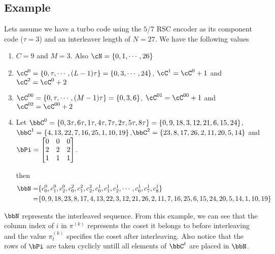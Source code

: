 \subsection{Example}
Lets assume we have a turbo code using the $5/7$ RSC encoder as its component code ($\tau=3$) and an interleaver length of $N=27$. We have the following values
\begin{enumerate}
\item $C=9$ and $M=3$. Also $\cN=\{0,1,\cdots,26\}$

\item $\cC^0=\{0,\tau,\cdots,(L-1)\tau\} = \{0,3,\cdots,24\}$, $\cC^1=\cC^0+1$ and $\cC^2=\cC^0+2$

\item $\cC^{00}=\{0,\tau,\cdots,(M-1)\tau\} = \{0,3,6\}$, $\cC^{01}=\cC^{00}+1$ and $\cC^{02}=\cC^{00}+2$

\item Let $\bbC^0=\{0, 3\tau, 6\tau, 1\tau, 4\tau, 7\tau, 2\tau, 5\tau, 8\tau \} = \{0, 9, 18, 3,12, 21, 6, 15, 24 \} $, $\bbC^1=\{4, 13, 22, 7, 16, 25, 1, 10, 19 \}$,$\bbC^2=\{ 23, 8, 17, 26, 2, 11, 20, 5, 14\} $ and $\bPi=\begin{bmatrix}0 & 0 & 0\cr2 & 2 & 2\cr1 & 1 & 1\end{bmatrix}$.

then 
 \begin{equation}
\begin{split}
\bbN=&\{c^0_0,c^0_1,c_2^0 ,c^2_0,c^2_1,c_2^2 ,c^1_0,c^1_1,c^1_2,\cdots, c^1_6,c^1_7,c^1_8\}\\
 =& \{0,9,18, 23,8,17,4,13,22 ,3,12,21,26,2,11,7,16,25,6,15,24,20,5,14,1,10,19\}
 \end{split}
 \end{equation}

\end{enumerate}
$\bbN$ represents the interleaved sequence. From this example, we can see that the column index of $i$ in $\pi^{(k)}$ represents the coset it belongs to before interleaving and the value $\pi_{t}^{(k)}$ specifies the coset after interleaving. Also notice that the rows of $\bPi$ are taken cyclicly untill all elements of $\bbC^t$ are placed in $\bbN$.

